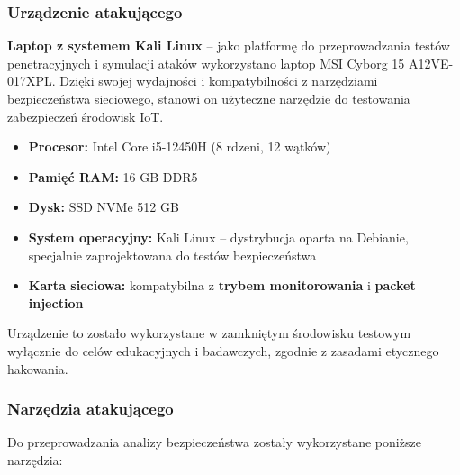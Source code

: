 \subsubsection{Urządzenie atakującego}

\textbf{Laptop z systemem Kali Linux} – jako platformę do przeprowadzania testów penetracyjnych i symulacji ataków wykorzystano laptop MSI Cyborg 15 A12VE-017XPL. Dzięki swojej wydajności i kompatybilności z narzędziami bezpieczeństwa sieciowego, stanowi on użyteczne narzędzie do testowania zabezpieczeń środowisk IoT.

\begin{itemize}
\item \textbf{Procesor:} Intel Core i5-12450H (8 rdzeni, 12 wątków)

\item \textbf{Pamięć RAM:} 16 GB DDR5

\item \textbf{Dysk:} SSD NVMe 512 GB

\item \textbf{System operacyjny:} Kali Linux – dystrybucja oparta na Debianie, specjalnie zaprojektowana do testów bezpieczeństwa

\item \textbf{Karta sieciowa:} kompatybilna z \textbf{trybem monitorowania} i \textbf{packet injection}
\end{itemize}

Urządzenie to zostało wykorzystane w zamkniętym środowisku testowym wyłącznie do celów edukacyjnych i badawczych, zgodnie z zasadami etycznego hakowania.

\vspace{5mm}

\subsubsection{Narzędzia atakującego}

Do przeprowadzania analizy bezpieczeństwa zostały wykorzystane poniższe narzędzia:


